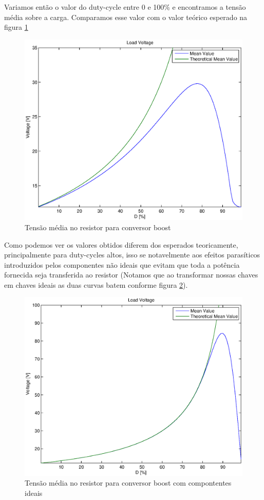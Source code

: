 \documentclass{article}
\begin{document}
Variamos então o valor do duty-cycle entre 0 e 100\% e encontramos a tensão média sobre a carga. Comparamos esse valor com o valor teórico esperado na figura \ref{fig:bovrxd}
\begin{figure}[H]
	\centering
	\includegraphics[width=0.7\linewidth]{matlab/boost/r_vrxd}
	\caption{Tensão média no resistor para conversor boost}
	\label{fig:bovrxd}
\end{figure}

Como podemos ver os valores obtidos diferem dos esperados teoricamente, principalmente para duty-cycles altos, isso se notavelmente aos efeitos parasíticos introduzidos pelos componentes não ideais que evitam que toda a potência fornecida seja transferida ao resistor (Notamos que ao transformar nossas chaves em chaves ideais as duas curvas batem conforme figura \ref{fig:borvxdi}).
\begin{figure}[H]
	\centering
	\includegraphics[width=0.7\linewidth]{matlab/boost/r_vrxdi}
	\caption{Tensão média no resistor para conversor boost com compontentes ideais}
	\label{fig:borvxdi}
\end{figure}
\end{document}
